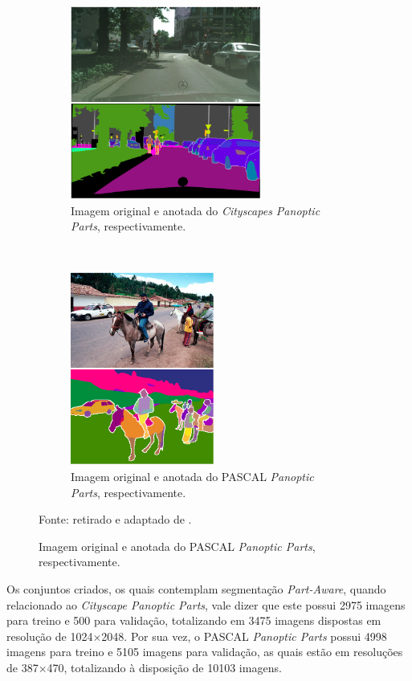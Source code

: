 \begin{figure}[H]
   \caption{Imagens originais e anotadas dos \textit{datasets} para \textit{Part-Aware Panoptic Segmentation}.}
   \centering
   \label{proposal:dataset:fig:1}
    \begin{subfigure}[t]{0.45\textwidth}
        \centering
        \includegraphics[height=2.5in]{recursos/imagens/proposal/city.png}
        \caption{Imagem original e anotada do \textit{Cityscapes Panoptic Parts}, respectivamente.}
        \label{proposal:dataset:fig:1.1}
    \end{subfigure}%
    ~ 
    \begin{subfigure}[t]{0.45\textwidth}
        \centering
        \includegraphics[height=2.5in]{recursos/imagens/proposal/pascal.png}
        \caption{Imagem original e anotada do PASCAL \textit{Panoptic Parts}, respectivamente.}
        \label{proposal:dataset:fig:1.2}
    \end{subfigure}%

    \vspace*{1 cm}
    Fonte: retirado e adaptado de \cite{Lin2016}.
\end{figure}


Os conjuntos criados, os quais contemplam segmentação \textit{Part-Aware}, quando relacionado ao \textit{Cityscape Panoptic Parts}, vale dizer que este possui 2975 imagens para treino e 500 para validação, totalizando em 3475 imagens dispostas em resolução de 1024×2048. Por sua vez, o PASCAL \textit{Panoptic Parts} possui 4998 imagens para treino e  5105 imagens para validação, as quais estão em resoluções de 387×470, totalizando à disposição de 10103 imagens.

